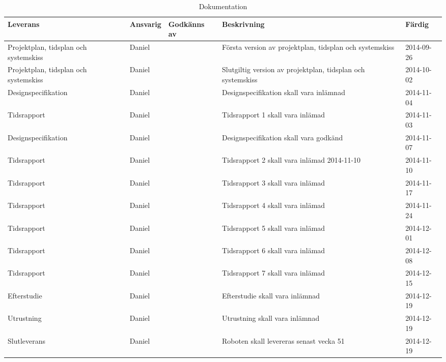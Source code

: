 \begin{table}[h]
  \centering
    \begin{tabularx}{\textwidth}{| X | l | l | X | l |}
      \hline
      \textbf{Leverans} & \textbf{Ansvarig} & \textbf{Godkänns av} & \textbf{Beskrivning} & \textbf{Färdig} \\
      \hline

      {Projektplan, tidsplan och systemskiss} & {Daniel} & {} & {Första version av projektplan, tidsplan och systemskiss} & {2014-09-26} \\
            \hline
      {Projektplan, tidsplan och systemskiss} & {Daniel} & {} & {Slutgiltig version av projektplan, tidsplan och systemskiss} & {2014-10-02} \\
      \hline
      {Designspecifikation} & {Daniel} & {} & {Designspecifikation skall vara inlämnad} & {2014-11-04} \\
      \hline
      {Tidsrapport} & {Daniel} & {} & {Tidsrapport 1 skall vara inlämad} & {2014-11-03} \\
      \hline
      {Designspecifikation} & {Daniel} & {} & {Designspecifikation skall vara godkänd} & {2014-11-07} \\
      \hline
      {Tidsrapport} & {Daniel} & {} & {Tidsrapport 2 skall vara inlämad 2014-11-10} & {2014-11-10} \\
      \hline
      {Tidsrapport} & {Daniel} & {} & {Tidsrapport 3 skall vara inlämad} & {2014-11-17} \\
      \hline
      {Tidsrapport} & {Daniel} & {} & {Tidsrapport 4 skall vara inlämad} & {2014-11-24} \\
      \hline
      {Tidsrapport} & {Daniel} & {} & {Tidsrapport 5 skall vara inlämad} & {2014-12-01} \\
      \hline
      {Tidsrapport} & {Daniel} & {} & {Tidsrapport 6 skall vara inlämad} & {2014-12-08} \\
      \hline
      {Tidsrapport} & {Daniel} & {} & {Tidsrapport 7 skall vara inlämad} & {2014-12-15} \\
      \hline
      {Efterstudie} & {Daniel} & {} & {Efterstudie skall vara inlämnad} & {2014-12-19} \\
      \hline
      {Utrustning} & {Daniel} & {} & {Utrustning skall vara inlämnad} & {2014-12-19} \\
      \hline
      {Slutleverans} & {Daniel} & {} & {Roboten skall levereras senast vecka 51} & {2014-12-19} \\
      \hline

    \end{tabularx}
  \caption{Dokumentation} \label{dokumentation:tabell}
\end{table}


